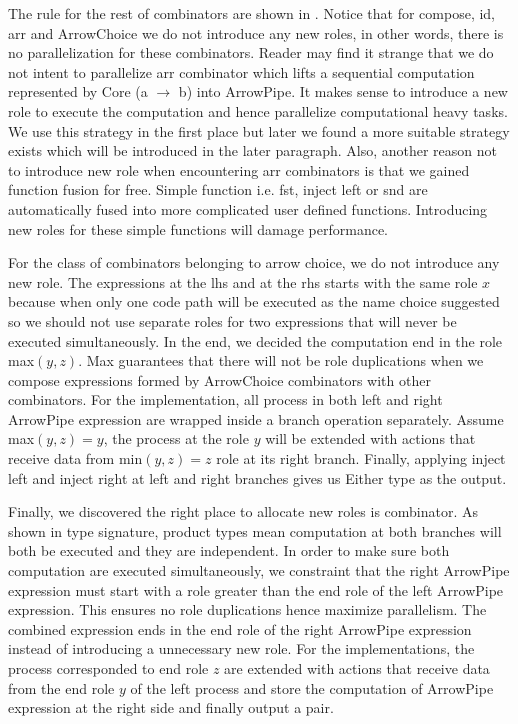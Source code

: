 The rule for the rest of combinators are shown in . Notice that for compose, id, arr and ArrowChoice we do not introduce any new roles, in other words, there is no parallelization for these combinators. Reader may find it strange that we do not intent to parallelize arr combinator which lifts a sequential computation represented by Core (a $\rightarrow$ b) into ArrowPipe. It makes sense to introduce a new role to execute the computation and hence parallelize computational heavy tasks. We use this strategy in the first place but later we found a more suitable strategy exists which will be introduced in the later paragraph. Also, another reason not to introduce new role when encountering arr combinators is that we gained function fusion for free. Simple function i.e. fst, inject left or snd are automatically fused into more complicated user defined functions. Introducing new roles for these simple functions will damage performance. %

For the class of combinators belonging to arrow choice, we do not introduce any new role. The expressions at the lhs and at the rhs starts with the same role $x$ because when only one code path will be executed as the name choice suggested so we should not use separate roles for two expressions that will never be executed simultaneously. In the end, we decided the computation end in the role max$(y,z)$. Max guarantees that there will not be role duplications when we compose expressions formed by ArrowChoice combinators with other combinators. For the implementation, all process in both left and right ArrowPipe expression are wrapped inside a branch operation separately. Assume max$(y, z) = y$, the process at the role $y$ will be extended with actions that receive data from min$(y, z) = z$ role at its right branch. Finally, applying inject left and inject right at left and right branches gives us Either type as the output.

Finally, we discovered the right place to allocate new roles is \hask{&&&} combinator. As shown in type signature, product types mean computation at both branches will both be executed and they are independent. In order to make sure both computation are executed simultaneously, we constraint that the right ArrowPipe expression must start with a role greater than the end role of the left ArrowPipe expression. This ensures no role duplications hence maximize parallelism. The combined expression ends in the end role of the right ArrowPipe expression instead of introducing a unnecessary new role. For the implementations, the process corresponded to end role $z$ are extended with actions that receive data from the end role $y$ of the left process and store the computation of ArrowPipe expression at the right side and finally output a pair.


